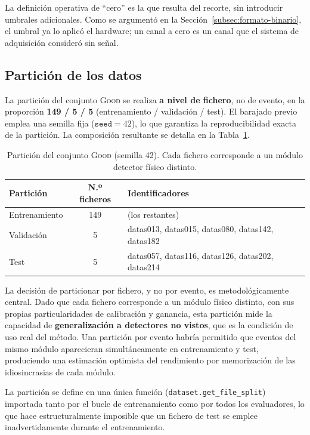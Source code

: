 La definición operativa de ``cero'' es la que resulta del recorte, sin introducir umbrales
adicionales. Como se argumentó en la Sección~\ref{subsec:formato-binario}, el umbral ya lo aplicó el
hardware; un canal a cero es un canal que el sistema de adquisición consideró sin señal.

\subsection{Partición de los datos}
\label{subsec:particion}

La partición del conjunto \textsc{Good} se realiza \textbf{a nivel de fichero}, no de evento, en la
proporción \textbf{149 / 5 / 5} (entrenamiento / validación / test). El barajado previo emplea una
semilla fija ($\texttt{seed} = 42$), lo que garantiza la reproducibilidad exacta de la partición.
La composición resultante se detalla en la Tabla~\ref{tab:particion}.

\begin{table}[htbp]
\centering
\caption{Partición del conjunto \textsc{Good} (semilla 42). Cada fichero corresponde a un módulo
detector físico distinto.}
\label{tab:particion}
\begin{tabular}{lcl}
\toprule
\textbf{Partición} & \textbf{N.º ficheros} & \textbf{Identificadores} \\
\midrule
Entrenamiento & 149 & (los restantes) \\
Validación & 5 & datas013, datas015, datas080, datas142, datas182 \\
Test & 5 & datas057, datas116, datas126, datas202, datas214 \\
\bottomrule
\end{tabular}
\end{table}

La decisión de particionar por fichero, y no por evento, es metodológicamente central. Dado que cada
fichero corresponde a un módulo físico distinto, con sus propias particularidades de calibración y
ganancia, esta partición mide la capacidad de \textbf{generalización a detectores no vistos}, que es
la condición de uso real del método. Una partición por evento habría permitido que eventos del mismo
módulo aparecieran simultáneamente en entrenamiento y test, produciendo una estimación
optimista del rendimiento por memorización de las idiosincrasias de cada módulo.

La partición se define en una única función (\texttt{dataset.get\_file\_split}) importada tanto por
el bucle de entrenamiento como por todos los evaluadores, lo que hace estructuralmente imposible que
un fichero de test se emplee inadvertidamente durante el entrenamiento.

